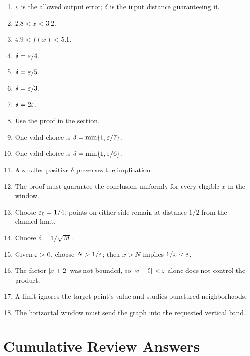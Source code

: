 \begin{enumerate}[label=\textbf{6.\arabic*}]
  \item \(\varepsilon\) is the allowed output error; \(\delta\) is the input distance guaranteeing it.
  \item \(2.8<x<3.2\).
  \item \(4.9<f(x)<5.1\).
  \item \(\delta=\varepsilon/4\).
  \item \(\delta=\varepsilon/5\).
  \item \(\delta=\varepsilon/3\).
  \item \(\delta=2\varepsilon\).
  \item Use the proof in the section.
  \item One valid choice is \(\delta=\min\{1,\varepsilon/7\}\).
  \item One valid choice is \(\delta=\min\{1,\varepsilon/6\}\).
  \item A smaller positive \(\delta\) preserves the implication.
  \item The proof must guarantee the conclusion uniformly for every eligible \(x\) in the window.
  \item Choose \(\varepsilon_0=1/4\); points on either side remain at distance \(1/2\) from the claimed limit.
  \item Choose \(\delta=1/\sqrt M\).
  \item Given \(\varepsilon>0\), choose \(N>1/\varepsilon\); then \(x>N\) implies \(1/x<\varepsilon\).
  \item The factor \(|x+2|\) was not bounded, so \(|x-2|<\varepsilon\) alone does not control the product.
  \item A limit ignores the target point's value and studies punctured neighborhoods.
  \item The horizontal window must send the graph into the requested vertical band.
\end{enumerate}

\section{Cumulative Review Answers}

